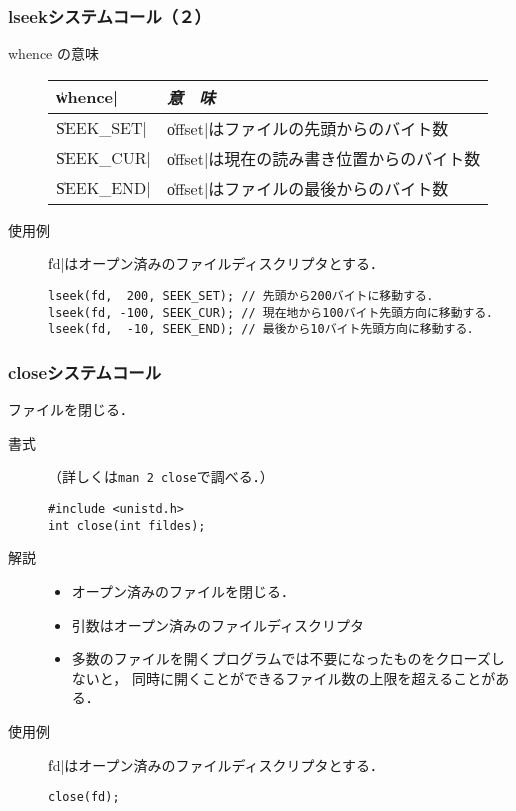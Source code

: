 \documentclass{beamer}                 %
\begin{document}
\begin{frame}[fragile]
  \frametitle{lseekシステムコール（２）}
\begin{description}
\item[whence の意味]
\begin{tabular}{l | l}
\hline\hline
\|whence|    & \emph{意　味} \\\hline
\|SEEK_SET|  &  \|offset|はファイルの先頭からのバイト数  \\
\|SEEK_CUR|  &  \|offset|は現在の読み書き位置からのバイト数  \\
\|SEEK_END|  &  \|offset|はファイルの最後からのバイト数  \\
\end{tabular}

\vfill

\item[使用例]
\|fd|はオープン済みのファイルディスクリプタとする．

\begin{lstlisting}[numbers=none]
lseek(fd,  200, SEEK_SET); // 先頭から200バイトに移動する．
lseek(fd, -100, SEEK_CUR); // 現在地から100バイト先頭方向に移動する．
lseek(fd,  -10, SEEK_END); // 最後から10バイト先頭方向に移動する．
\end{lstlisting}

\end{description}
\end{frame}

\begin{frame}[fragile]
  \frametitle{closeシステムコール}
ファイルを閉じる．
\begin{description}
\item[書式]（詳しくは\texttt{man 2 close}で調べる．）

\begin{lstlisting}[numbers=none]
#include <unistd.h>
int close(int fildes);
\end{lstlisting}

\item[解説]
\begin{itemize}
\item オープン済みのファイルを閉じる．
\item 引数はオープン済みのファイルディスクリプタ
\item 多数のファイルを開くプログラムでは不要になったものをクローズしないと，
同時に開くことができるファイル数の上限を超えることがある．
\end{itemize}

\item[使用例]
\|fd|はオープン済みのファイルディスクリプタとする．

\begin{lstlisting}[numbers=none]
close(fd);
\end{lstlisting}
\end{description}
\end{frame}
\end{document}
